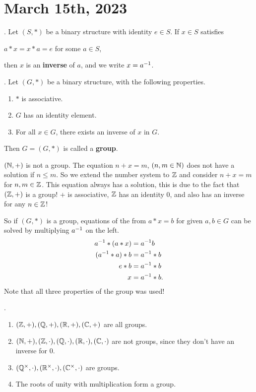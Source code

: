 \section*{March 15th, 2023}


.  Let \((S, *)\) be a binary structure with identity \(e \in S\). If \(x \in S\) satisfies
\begin{center}
    \(a * x = x * a = e\) for some \(a \in S\),
\end{center}
then \(x\) is an \textbf{inverse} of \(a\), and we write \(x = a^{-1}\).

.  Let \((G, *)\) be a binary structure, with the following properties.
\begin{enumerate}
    \item \(*\) is associative.
    \item \(G\) has an identity element.
    \item For all \(x \in G\), there exists an inverse of \(x\) in \(G\).
\end{enumerate}
Then \(G = (G, *)\) is called a \textbf{group}.

\((\mathbb{N}, +)\) is not a group. The equation \(n + x = m\), \((n, m \in \mathbb{N})\) does not have a solution if \(n \leq m\). So we extend the number system to \(\mathbb{Z}\) and consider \(n + x = m\) for \(n, m \in \mathbb{Z}\). This equation always has a solution, this is due to the fact that \((\mathbb{Z}, +)\) is a group! \(+\) is associative, \(\mathbb{Z}\) has an identity \(0\), and also has an inverse for any \(n\in \mathbb{Z}\)!

So if \((G, *)\) is a group, equations of the from \(a * x = b\) for given \(a, b \in G\) can be solved by multiplying \(a^{-1}\) on the left.
\[
    \begin{aligned}
        a^{-1} * (a * x) & = a^{-1} b    \\
        (a^{-1} * a) * b & = a^{-1} * b  \\
        e * b           & = a^{-1} * b  \\
        x               & = a^{-1} * b.
    \end{aligned}
\]
Note that all three properties of the group was used!

\ex.
\begin{enumerate}
    \item \((\mathbb{Z}, +), (\mathbb{Q}, +), (\mathbb{R}, +), (\mathbb{C}, +)\) are all groups.
    \item \((\mathbb{N}, +), (\mathbb{Z}, \cdot), (\mathbb{Q}, \cdot), (\mathbb{R}, \cdot), (\mathbb{C}, \cdot)\) are not groups, since they don't have an inverse for \(0\).
    \item \((\mathbb{Q}^\times, \cdot), (\mathbb{R}^\times, \cdot), (\mathbb{C}^\times, \cdot)\) are groups.
    \item The roots of unity with multiplication form a group.
\end{enumerate}


